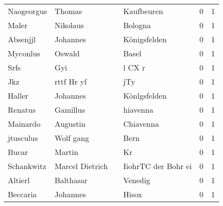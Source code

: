 \documentclass[10pt,a4paper,landscape]{article}
\begin{document}
\begin{longtable}{llllrr}
               Naogeorgus &                             Thomas &             &                                  Kaufbeuren &          0 &         1 \\
                    Maler &                           Nikolaus &             &                                     Bologna &          0 &         1 \\
                 Absenjjl &                           Johannes &             &                                Königsfelden &          0 &         1 \\
                 Myconlus &                             Oswald &             &                                       Basel &          0 &         1 \\
                     Srfs &                                Gyi &             &                                      l CX r &          0 &         1 \\
                      Jkz &                         rttf Hr yf &             &                                         jTy &          0 &         1 \\
                   Haller &                           Johannes &             &                                Könlgsfelden &          0 &         1 \\
                  Renatus &                           Gamillus &             &                                    hiavenna &          0 &         1 \\
                 Mainardo &                           Augustin &             &                                   Chiavenna &          0 &         1 \\
                jtusculus &                          Wolf gang &             &                                        Bern &          0 &         1 \\
                    Bucar &                             Martin &             &                                          Kr &          0 &         1 \\
               Schankwitz &                    Marcel Dietrich &             &                         IiohrTC der Bohr ei &          0 &         1 \\
                  Altierl &                          Balthasar &             &                                     Venedig &          0 &         1 \\
                 Beccaria &                           Johannes &             &                                       Hisox &          0 &         1 \\

\end{longtable}
\end{document}
